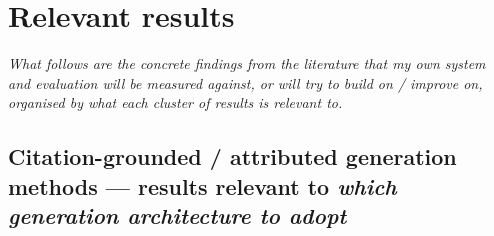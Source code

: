 \section{Relevant results}\label{sec:results}

\textit{What follows are the concrete findings from the literature that my own system and evaluation will be measured against, or will try to build on / improve on, organised by what each cluster of results is relevant to.}



\subsection{Citation-grounded / attributed generation methods — results relevant to \textit{which generation architecture to adopt}}\label{sec:res-generation}

